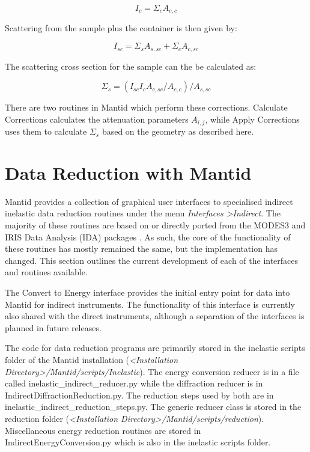 \documentclass[paper=a4, fontsize=11pt]{scrartcl}	%
\numberwithin{equation}{section}															%
\numberwithin{figure}{section}																%
\numberwithin{table}{section}																%
\begin{document}
\begin{equation}
I_c = \Sigma_c A_{c,c}
\end{equation}

Scattering from the sample plus the container is then given by:

\begin{equation}
I_{sc} = \Sigma_s A_{s,sc} + \Sigma_c A_{c,sc}
\end{equation}

The scattering cross section for the sample can the be calculated as:

\begin{equation}
\Sigma_s = (I_{sc}I_cA_{c,sc}/A_{c,c}) / A_{s,sc}
\end{equation}

There are two routines in Mantid which perform these corrections. Calculate Corrections calculates the attenuation parameters $A_{i,j}$, while Apply Corrections uses them to calculate $\Sigma_s$ based on the geometry as described here.

\section{Data Reduction with Mantid}
Mantid provides a collection of graphical user interfaces to specialised indirect inelastic data reduction routines under the menu \textit{Interfaces \textgreater Indirect}. The majority of these routines are based on or directly ported from the MODES3 and IRIS Data Analysis (IDA) packages \cite{wshowells2010}. As such, the core of the functionality of these routines has mostly remained the same, but the implementation has changed. This section outlines the current development of each of the interfaces and routines available.

The Convert to Energy interface provides the initial entry point for data into Mantid for indirect instruments. The functionality of this interface is currently also shared with the direct instruments, although a separation of the interfaces is planned in future releases.

The code for data  reduction programs are primarily stored in the inelastic scripts folder of the Mantid installation (\textit{\textless Installation Directory\textgreater /Mantid/scripts/Inelastic}). The energy conversion reducer is in a file called inelastic\_indirect\_reducer.py while the diffraction reducer is in IndirectDiffractionReduction.py. The reduction steps used by both are in inelastic\_indirect\_reduction\_steps.py. The generic reducer class is stored in the reduction folder (\textit{\textless Installation Directory\textgreater/Mantid/scripts/reduction}). Miscellaneous energy reduction routines are stored in IndirectEnergyConversion.py which is also in the inelastic scripts folder.
\end{document}
